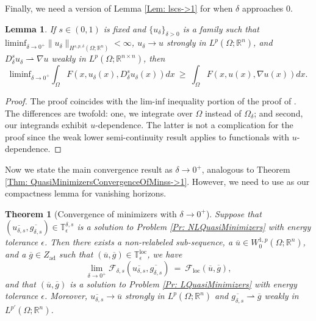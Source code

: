 \documentclass[11pt, reqno]{amsart}   	%
\theoremstyle{plain}
\numberwithin{equation}{section}
\newtheorem{theorem}[thm]{Theorem}
\newtheorem{lemma}[thm]{Lemma}
\def\de{\delta}
\def\ep{\epsilon}
\def\Om{\Omega}
\def\R{\mathbb{R}}
\def\grad{\nabla}
\def\liminf{\text{liminf}}
\def\loc{\text{loc}}
\begin{document}
Finally, we need a version of Lemma \ref{Lem: lscs->1} for when $\de$ approaches $0$.

\begin{lemma}\label{Lem: lscde->0}
     If $s \in (0, 1)$ is fixed and $\{u_{\de}\}_{\de > 0}$ is a family such that $\liminf_{\de \rightarrow 0^+}\|u_{\de}\|_{H^{s, p, \de}(\Om; \R^n)} < \infty$, $u_{\de} \rightarrow u$ strongly in $L^p(\Om; \R^n)$, and $D^s_{\de} u_{\de} \rightharpoonup \grad u$ weakly in $L^p(\Om; \R^{n \times n})$, then
            \begin{equation}\label{Eq: lscde->0}
                \liminf_{\de \rightarrow 0^+}\int_{\Om}F(x, u_{\de}(x), D^s_{\de}u_{\de}(x))dx \ \geq \ \int_{\Om}F(x, u(x), \grad u(x))dx.
            \end{equation}
    
\end{lemma}

\begin{proof}
    The proof coincides with the lim-inf inequality portion of the proof of \cite[Theorem 3.7]{cueto2025gamma}. The differences are twofold: one, we integrate over $\Om$ instead of $\Om_{\de}$; and second, our integrands exhibit $u$-dependence. The latter is not a complication for the proof since the weak lower semi-continuity result \cite[Theorem 8.11]{dacorogna2007direct} applies to functionals with $u$-dependence. 
\end{proof}

Now we state the main convergence result as $\de \rightarrow 0^+$, analogous to Theorem \ref{Thm: QuasiMinimizersConvergenceOfMinss->1}. However, we need to use \cite[Lemma 3.6]{cueto2025gamma} as our compactness lemma for vanishing horizons.

\begin{theorem}[Convergence of minimizers with $\de \rightarrow 0^+$]\label{Thm: QuasiMinimizersConvergenceOfMinsDe->0}
    Suppose that $(\overline{u_{\de, s}}, \overline{g_{\de, s}}) \in \mathbb{T}^{\de, s}_{\ep}$ is a solution to Problem \ref{Pr: NLQuasiMinimizers} with energy tolerance $\ep$. Then there exists a non-relabeled sub-sequence, a $\overline{u} \in W^{1, p}_0(\Om; \R^n)$, and a $\overline{g} \in Z_{\text{ad}}$ such that $(\overline{u}, \overline{g}) \in \mathbb{T}^{\loc}_{\ep}$, we have
    \begin{equation}\label{Eq: QuasiMinimizersConvergenceOfMinsDe->0}
        \lim_{\de \rightarrow 0^+}\mathcal{F}_{\de, s}(\overline{u_{\de, s}}, \overline{g_{\de, s}}) \ = \ \mathcal{F}_{\loc}(\overline{u}, \overline{g}),
    \end{equation}
    and that $(\overline{u}, \overline{g})$ is a solution to Problem \ref{Pr: LQuasiMinimizers} with energy tolerance $\ep$. Moreover, $\overline{u_{\de, s}} \rightarrow \overline{u}$ strongly in $L^p(\Om; \R^n)$ and $\overline{g_{\de, s}} \rightharpoonup \overline{g}$ weakly in $L^{p'}(\Om; \R^n)$.
 \end{theorem}
\end{document}

